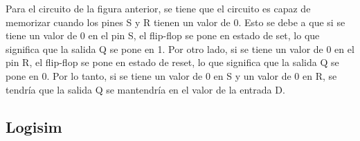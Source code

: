 \documentclass{templateNote}
\begin{document}
\begin{enumerate}
    Para el circuito de la figura anterior, se tiene que el circuito es capaz de memorizar cuando los pines S y R tienen un valor de 0. Esto se debe a que si se tiene un valor de 0 en el pin S, el flip-flop se pone en estado de set, lo que significa que la salida Q se pone en 1. Por otro lado, si se tiene un valor de 0 en el pin R, el flip-flop se pone en estado de reset, lo que significa que la salida Q se pone en 0. Por lo tanto, si se tiene un valor de 0 en S y un valor de 0 en R, se tendría que la salida Q se mantendría en el valor de la entrada D.

\end{enumerate}

\newpage
\subsection{Logisim}
\end{document}
